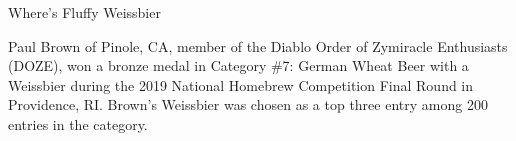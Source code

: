 \begin{recipie}{Where's Fluffy Weissbier}

\begin{aboutblock}
Paul Brown of Pinole, CA, member of the Diablo Order of Zymiracle Enthusiasts (DOZE),
won a bronze medal in Category \#7: German Wheat Beer with a Weissbier during the 2019
National Homebrew Competition Final Round in Providence, RI. Brown's Weissbier was
chosen as a top three entry among 200 entries in the category. \sourceaha
\end{aboutblock}


\begin{methodandtiming}
 
\begin{mashsteps}
\end{mashsteps}

\begin{fermentationsteps}
\end{fermentationsteps}

\end{methodandtiming}

\pagebreak

\begin{ingredientsblock}

\begin{malts}
\end{malts}

\begin{hops}
\end{hops}


\end{ingredientsblock}

\end{recipie}
